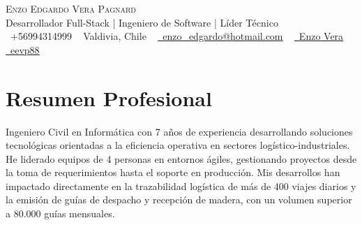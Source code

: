 \documentclass[letterpaper,11pt]{article}
\begin{document}

\begin{center}
    {\Huge \scshape Enzo Edgardo Vera Pagnard} \\ \vspace{1pt}
    Desarrollador Full-Stack | Ingeniero de Software | Líder Técnico\\ \vspace{1pt}
    \small \raisebox{-0.1\height}\faWhatsapp\ +56994314999 ~ 
    Valdivia, Chile ~ 
    \href{mailto:enzo_edgardo@hotmail.com}{\raisebox{-0.2\height}\faEnvelope\ \underline{enzo\_edgardo@hotmail.com}} ~ 
    \href{https://www.linkedin.com/in/enzoverapagnard/}{\raisebox{-0.2\height}\faLinkedin\ \underline{Enzo Vera}}  ~
    \href{https://github.com/eevp88}{\raisebox{-0.2\height}\faGithub\ \underline{eevp88}}
    \vspace{-8pt}
\end{center}


\section{Resumen Profesional}
Ingeniero Civil en Informática con 7 años de experiencia desarrollando soluciones tecnológicas orientadas a la eficiencia operativa en sectores logístico-industriales.  
He liderado equipos de 4 personas en entornos ágiles, gestionando proyectos desde la toma de requerimientos hasta el soporte en producción. 
Mis desarrollos han impactado directamente en la trazabilidad logística de más de 400 viajes diarios y la emisión de guías de despacho y recepción de madera, con un volumen superior a 80.000 guías mensuales.

\end{document}
